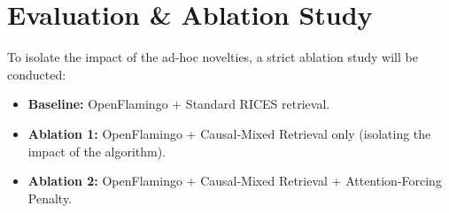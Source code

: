 \documentclass[11pt, letterpaper]{article}
\begin{document}
\section{Evaluation \& Ablation Study}
To isolate the impact of the ad-hoc novelties, a strict ablation study will be conducted:
\begin{itemize}[noitemsep, topsep=2pt]
    \item \textbf{Baseline:} OpenFlamingo + Standard RICES retrieval.
    \item \textbf{Ablation 1:} OpenFlamingo + Causal-Mixed Retrieval only (isolating the impact of the algorithm).
    \item \textbf{Ablation 2:} OpenFlamingo + Causal-Mixed Retrieval + Attention-Forcing Penalty.
\end{itemize}




\vspace{0.5cm}

\end{document}
